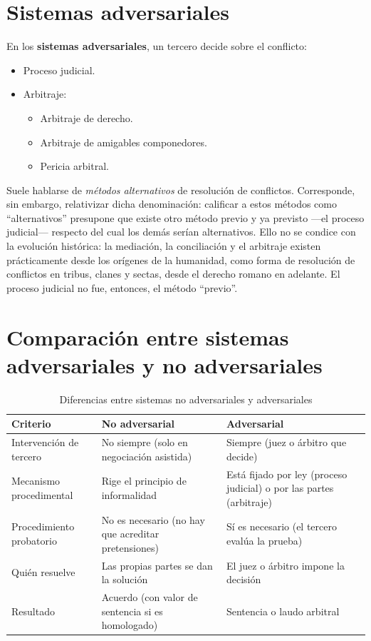 \documentclass[12pt,oneside]{book}
\begin{document}
\section{Sistemas adversariales}

En los \textbf{sistemas adversariales}, un tercero decide sobre el conflicto:
\begin{itemize}
    \item Proceso judicial.
    \item Arbitraje:
    \begin{itemize}
        \item Arbitraje de derecho.
        \item Arbitraje de amigables componedores.
        \item Pericia arbitral.
    \end{itemize}
\end{itemize}

\begin{note}
Suele hablarse de \textit{métodos alternativos} de resolución de conflictos. Corresponde, sin embargo, relativizar dicha denominación: calificar a estos métodos como ``alternativos'' presupone que existe otro método previo y ya previsto ---el proceso judicial--- respecto del cual los demás serían alternativos. Ello no se condice con la evolución histórica: la mediación, la conciliación y el arbitraje existen prácticamente desde los orígenes de la humanidad, como forma de resolución de conflictos en tribus, clanes y sectas, desde el derecho romano en adelante. El proceso judicial no fue, entonces, el método ``previo''.
\end{note}

\section{Comparación entre sistemas adversariales y no adversariales}

\begin{table}[H]
\centering
\begin{tabularx}{\textwidth}{@{}l X X@{}}
\toprule
\textbf{Criterio} & \textbf{No adversarial} & \textbf{Adversarial} \\
\midrule
Intervención de tercero & No siempre (solo en negociación asistida) & Siempre (juez o árbitro que decide) \\
Mecanismo procedimental & Rige el principio de informalidad & Está fijado por ley (proceso judicial) o por las partes (arbitraje) \\
Procedimiento probatorio & No es necesario (no hay que acreditar pretensiones) & Sí es necesario (el tercero evalúa la prueba) \\
Quién resuelve & Las propias partes se dan la solución & El juez o árbitro impone la decisión \\
Resultado & Acuerdo (con valor de sentencia si es homologado) & Sentencia o laudo arbitral \\
\bottomrule
\end{tabularx}
\caption{Diferencias entre sistemas no adversariales y adversariales}
\end{table}
\end{document}
